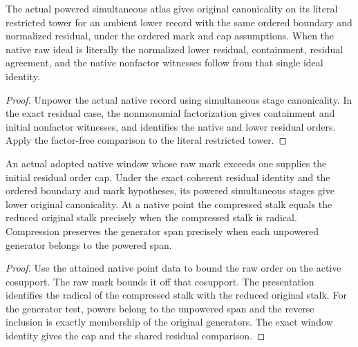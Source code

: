\begin{theorem}
\label{hir:g8-native-simultaneous-shared-residual}
\leanok
The actual powered simultaneous atlas gives original canonicality
on its literal restricted tower for an ambient lower record
with the same ordered boundary and normalized residual, under
the ordered mark and cap assumptions. When the native raw ideal
is literally the normalized lower residual, containment, residual
agreement, and the native nonfactor witnesses follow from that
single ideal identity.
\end{theorem}
\begin{proof}
Unpower the actual native record using simultaneous stage
canonicality. In the exact residual case, the nonmonomial
factorization gives containment and initial nonfactor witnesses,
and identifies the native and lower residual orders. Apply the
factor-free comparison to the literal restricted tower.
\end{proof}

\begin{theorem}
\label{hir:g8-native-residual-weight-criterion}
\leanok
An actual adopted native window whose raw mark exceeds one
supplies the initial residual order cap. Under the exact
coherent residual identity and the ordered boundary and mark
hypotheses, its powered simultaneous stages give lower original
canonicality. At a native point the compressed stalk equals
the reduced original stalk precisely when the compressed stalk
is radical. Compression preserves the generator span precisely
when each unpowered generator belongs to the powered span.
\end{theorem}
\begin{proof}
Use the attained native point data to bound the raw order on
the active cosupport. The raw mark bounds it off that cosupport.
The presentation identifies the radical of the compressed
stalk with the reduced original stalk. For the generator test,
powers belong to the unpowered span and the reverse inclusion
is exactly membership of the original generators. The exact
window identity gives the cap and the shared residual comparison.
\end{proof}

